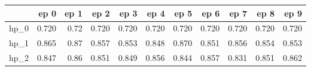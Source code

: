 \begin{tabular}{lrrrrrrrrrr}
\toprule
{} &   ep 0 &  ep 1 &   ep 2 &   ep 3 &   ep 4 &   ep 5 &   ep 6 &   ep 7 &   ep 8 &   ep 9 \\
\midrule
hp\_0 &  0.720 &  0.72 &  0.720 &  0.720 &  0.720 &  0.720 &  0.720 &  0.720 &  0.720 &  0.720 \\
hp\_1 &  0.865 &  0.87 &  0.857 &  0.853 &  0.848 &  0.870 &  0.851 &  0.856 &  0.854 &  0.853 \\
hp\_2 &  0.847 &  0.86 &  0.851 &  0.849 &  0.856 &  0.844 &  0.857 &  0.831 &  0.851 &  0.862 \\
\bottomrule
\end{tabular}
